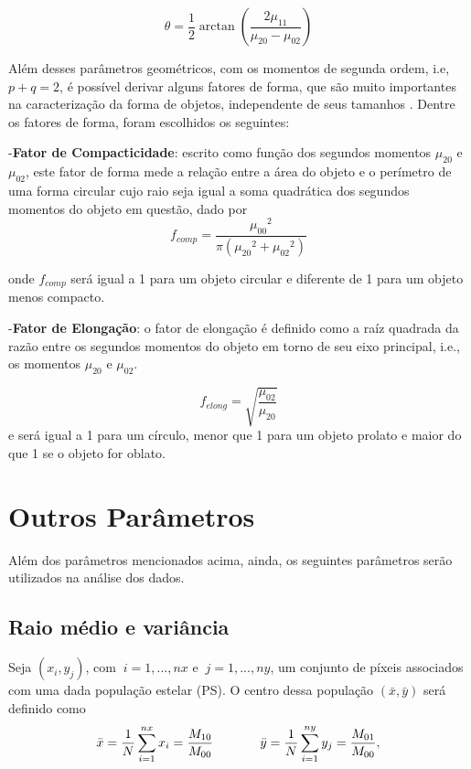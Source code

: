 \begin{equation}
\theta = \frac{1}{2}\arctan (\frac{2\mu_{11}}{\mu_{20} - \mu_{02}})
\end{equation}

Além desses parâmetros geométricos, com os momentos de segunda ordem, i.e, $p+q=2$, é possível derivar alguns fatores de forma, que são muito importantes na caracterização da forma de objetos, independente de seus tamanhos \citep{shapefactor}. Dentre os fatores de forma, foram escolhidos os seguintes:


-\textbf{Fator de Compacticidade}: escrito como função dos segundos momentos $\mu_{20}$ e $\mu_{02}$, este fator de forma mede a relação entre a área do objeto e o perímetro de uma forma circular cujo raio seja igual a soma quadrática dos segundos momentos do objeto em questão, dado por
\begin{equation}
f_{comp} = \frac{{\mu_{00}}^2}{\pi ({\mu_{20}}^2 + {\mu_{02}}^2)}
\end{equation}

onde $f_{comp}$ será igual a 1 para um objeto circular e diferente de 1 para um objeto menos compacto.
 
-\textbf{Fator de Elongação}: o fator de elongação é definido como a raíz quadrada da razão entre os segundos momentos do objeto em torno de seu eixo principal, i.e., os momentos $\mu_{20}$ e $\mu_{02}$.

\begin{equation}
f_{elong} = \sqrt{\frac{\mu_{02}}{\mu_{20}}}
\end{equation}
e será igual a 1 para um círculo, menor que 1 para um objeto prolato e maior do que 1 se o objeto for oblato.

\section{Outros Parâmetros}
Além dos parâmetros mencionados acima, ainda, os seguintes parâmetros serão utilizados na análise dos dados.

\subsection{Raio médio e variância}
Seja $(x_i,y_j)$, com  $~i=1,...,nx$ e $~j=1,...,ny$, um conjunto de píxeis associados com uma dada população estelar (PS). O centro dessa população $({\bar x},{\bar y})$ será definido como 
\begin{equation}
 {\bar x} = {1 \over N}\sum_{i=1}^{nx} x_i = \frac{M_{10}}{M_{00}}~~~~~~~~~~~
{\bar y} = {1 \over N}\sum_{i=1}^{ny} y_j = \frac{M_{01}}{M_{00}},
\end{equation}

